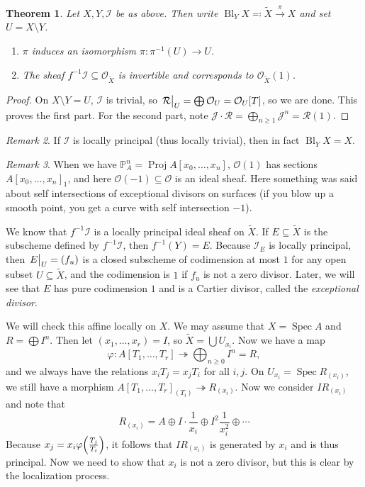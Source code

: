 \documentclass[leqno, openany]{memoir}
\newtheorem{thm}{Theorem}[section]
\theoremstyle{definition}
\theoremstyle{remark}
\newtheorem{rmk}[thm]{Remark}
\theoremstyle{plain}
\theoremstyle{definition}
\theoremstyle{remark}
\renewcommand{\P}{\mathbb{P}}
\newcommand{\mc}[1]{\mathcal{#1}}
\newcommand{\wt}[1]{\widetilde{#1}}
\DeclareMathOperator{\Spec}{Spec}
\DeclareMathOperator{\Proj}{Proj}
\DeclareMathOperator{\Bl}{Bl}
\begin{document}
\begin{thm} Let $X, Y, \mc{I}$ be as above. Then write $\Bl_Y X \eqqcolon
    \wt{X} \xrightarrow{\pi} X$ and set $U = X \setminus Y$.  \begin{enumerate}
        \item $\pi$ induces an isomorphism $\pi \colon \pi^{-1}(U) \to U$.
        \item The sheaf $f^{-1} \mc{I} \subseteq \mc{O}_{\wt{X}}$ is invertible
            and corresponds to $\mc{O}_{\wt{X}}(1)$.  \end{enumerate} \end{thm}

\begin{proof} On $X \setminus Y = U$, $\mc{I}$ is trivial, so $\eval{\mc{R}}_U
    = \bigoplus \mc{O}_U = \mc{O}_U[T]$, so we are done. This proves the first
    part. For the second part, note $\mc{J} \cdot \mc{R} = \bigoplus_{n \geq 1}
    \mc{J}^n = \mc{R}(1)$.  \end{proof}

\begin{rmk} If $\mc{I}$ is locally principal (thus locally trivial), then in
fact $\Bl_Y X = X$.  \end{rmk}

\begin{rmk} When we have $\P^n_A = \Proj A[x_0, \ldots, x_n]$, $\mc{O}(1)$ has
    sections ${A[x_0, \ldots, x_n]}_1$, and here $\mc{O}(-1) \subseteq \mc{O}$
    is an ideal sheaf. Here something was said about self intersections of
    exceptional divisors on surfaces (if you blow up a smooth point, you get a
    curve with self intersection $-1$).  \end{rmk}

We know that $f^{-1} \mc{I}$ is a locally principal ideal sheaf on $\wt{X}$. If
$E \subseteq \wt{X}$ is the subscheme defined by $f^{-1} \mc{I}$, then
$f^{-1}(Y) = E$. Because $\mc{I}_E$ is locally principal, then $\eval{E}_U =
(f_u)$ is a closed subscheme of codimension at most $1$ for any open subset $U
\subseteq \wt{X}$, and the codimension is $1$ if $f_u$ is not a zero divisor.
Later, we will see that $E$ has pure codimension $1$ and is a Cartier divisor,
called the \textit{exceptional divisor}. 

We will check this affine locally on $X$. We may assume that $X = \Spec A$ and
$R = \bigoplus I^n$. Then let $(x_1, \ldots, x_r) = I$, so $\wt{X} = \bigcup
U_{x_i}$. Now we have a map \[ \varphi \colon A[T_1, \ldots, T_r]
\twoheadrightarrow \bigoplus_{n \geq 0} I^n = R, \] and we always have the
relations $x_i T_j = x_j T_i$ for all $i,j$. On $U_{x_i} = \Spec R_{(x_i)}$, we
still have a morphism ${ A[T_1, \ldots, T_r] }_{(T_i)} \twoheadrightarrow
R_{(x_i)}$. Now we consider $I R_{(x_i)}$ and note that \[ R_{(x_i)} = A \oplus
I \cdot \frac{1}{x_i} \oplus I^2 \frac{1}{x_i^2} \oplus \cdots \] Because $x_j
= x_i \varphi \qty(\frac{T_j}{T_i})$, it follows that $I R_{(x_i)}$ is
generated by $x_i$ and is thus principal. Now we need to show that $x_i$ is not
a zero divisor, but this is clear by the localization process.
\end{document}
